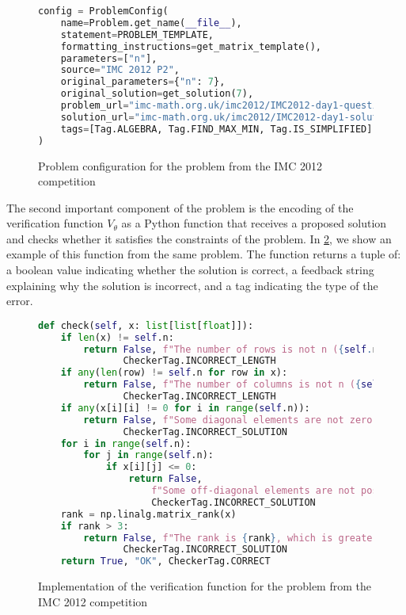 \begin{figure}[h]
\begin{lstlisting}[language=Python]
config = ProblemConfig(
    name=Problem.get_name(__file__),
    statement=PROBLEM_TEMPLATE,
    formatting_instructions=get_matrix_template(),
    parameters=["n"],
    source="IMC 2012 P2",
    original_parameters={"n": 7},
    original_solution=get_solution(7),
    problem_url="imc-math.org.uk/imc2012/IMC2012-day1-questions.pdf",
    solution_url="imc-math.org.uk/imc2012/IMC2012-day1-solutions.pdf",
    tags=[Tag.ALGEBRA, Tag.FIND_MAX_MIN, Tag.IS_SIMPLIFIED],
)
\end{lstlisting}
\caption{Problem configuration for the problem from the IMC 2012 competition}
\label{fig:problem:config}
\end{figure}

The second important component of the problem is the encoding of the verification function $V_\theta$ as a Python function that receives a proposed solution and checks whether it satisfies the constraints of the problem. In \cref{fig:problem:checker}, we show an example of this function from the same problem. The function returns a tuple of: a boolean value indicating whether the solution is correct, a feedback string explaining why the solution is incorrect, and a tag indicating the type of the error.

\begin{figure}[h]
\begin{lstlisting}[language=Python]
def check(self, x: list[list[float]]):
    if len(x) != self.n:
        return False, f"The number of rows is not n ({self.n}).", 
               CheckerTag.INCORRECT_LENGTH
    if any(len(row) != self.n for row in x):
        return False, f"The number of columns is not n ({self.n}).", 
               CheckerTag.INCORRECT_LENGTH
    if any(x[i][i] != 0 for i in range(self.n)):
        return False, f"Some diagonal elements are not zero.",
               CheckerTag.INCORRECT_SOLUTION
    for i in range(self.n):
        for j in range(self.n):
            if x[i][j] <= 0: 
                return False, 
                    f"Some off-diagonal elements are not positive.",
                    CheckerTag.INCORRECT_SOLUTION
    rank = np.linalg.matrix_rank(x)
    if rank > 3:
        return False, f"The rank is {rank}, which is greater than 3.",
               CheckerTag.INCORRECT_SOLUTION
    return True, "OK", CheckerTag.CORRECT
\end{lstlisting}
\vspace{-3mm}
\caption{Implementation of the verification function for the problem from the IMC 2012 competition}
\label{fig:problem:checker}
\end{figure}

